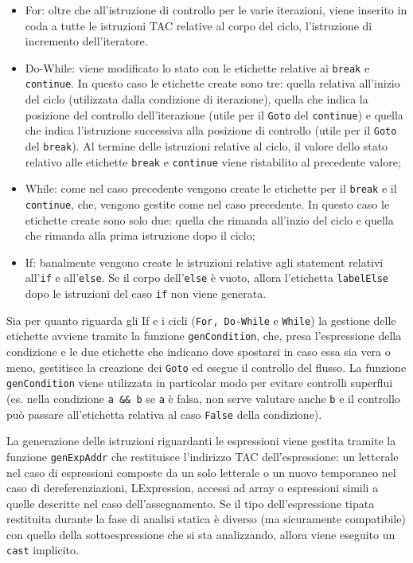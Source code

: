 \begin{itemize}
    \item For: oltre che all'istruzione di controllo per le varie iterazioni, viene inserito in coda a tutte le istruzioni TAC relative al corpo del ciclo, l'istruzione di incremento dell'iteratore. 
    
    \item Do-While: viene modificato lo stato con le etichette relative ai {\tt break} e {\tt continue}. In questo caso le etichette create sono tre: quella relativa all'inizio del ciclo (utilizzata dalla condizione di iterazione), quella che indica la posizione del controllo dell'iterazione (utile per il {\tt Goto}  del {\tt continue}) e quella che indica l'istruzione successiva alla posizione di controllo (utile per il {\tt Goto} del {\tt break}). Al termine delle istruzioni relative al ciclo, il valore dello stato relativo alle etichette {\tt break} e {\tt continue} viene ristabilito al precedente valore;
    \item While: come nel caso precedente vengono create le etichette per il {\tt break} e il {\tt continue}, che, vengono gestite come nel caso precedente. In questo caso le etichette create sono solo due: quella che rimanda all'inzio del ciclo e quella che rimanda alla prima istruzione dopo il ciclo;
    \item If: banalmente vengono create le istruzioni relative agli statement relativi all'{\tt if} e all'{\tt else}. Se il corpo dell'{\tt else} è vuoto, allora l'etichetta {\tt labelElse} dopo le istruzioni del caso {\tt if} non viene generata.
\end{itemize}

Sia per quanto riguarda gli {\ff If} e i cicli ({\tt For, Do-While} e {\tt While}) la gestione delle etichette avviene tramite la funzione {\tt genCondition}, che, presa l'espressione della condizione e le due etichette che indicano dove spostarsi in caso essa sia vera o meno, gestitisce la creazione dei {\tt Goto} ed esegue il controllo del flusso. La funzione {\tt genCondition} viene utilizzata in particolar modo per evitare controlli superflui (es. nella condizione {\tt a \&\& b} se {\tt a} è falsa, non serve valutare anche {\tt b} e il controllo può passare all'etichetta relativa al caso {\tt False} della condizione).


La generazione delle istruzioni riguardanti le espressioni viene gestita tramite la funzione {\tt genExpAddr} che restituisce l'indirizzo TAC dell'espressione: un letterale nel caso di espressioni composte da un solo letterale o un nuovo temporaneo nel caso di dereferenziazioni, LExpression, accessi ad array o espressioni simili a quelle descritte nel caso dell'assegnamento. Se il tipo dell'espressione tipata restituita durante la fase di analisi statica è diverso (ma sicuramente compatibile) con quello della sottoespressione che si sta analizzando, allora viene eseguito un {\tt cast} implicito.

